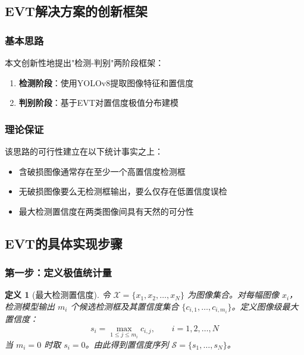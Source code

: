 \documentclass[12pt,a4paper]{ctexart}
\theoremstyle{cumcm}
\newtheorem{definition}{定义}[section]
\begin{document}
\subsection{EVT解决方案的创新框架}

\subsubsection{基本思路}

本文创新性地提出"检测-判别"两阶段框架：
\begin{enumerate}[leftmargin=2.2em,itemsep=2pt]
\item \textbf{检测阶段}：使用YOLOv8提取图像特征和置信度
\item \textbf{判别阶段}：基于EVT对置信度极值分布建模
\end{enumerate}

\subsubsection{理论保证}

该思路的可行性建立在以下统计事实之上：
\begin{itemize}
\item 含破损图像通常存在至少一个高置信度检测框
\item 无破损图像要么无检测框输出，要么仅存在低置信度误检
\item 最大检测置信度在两类图像间具有天然的可分性
\end{itemize}

\subsection{EVT的具体实现步骤}

\subsubsection{第一步：定义极值统计量}

\begin{definition}[最大检测置信度]
令 $\mathcal{X} = \{x_1, x_2, \ldots, x_N\}$ 为图像集合。对每幅图像 $x_i$，检测模型输出 $m_i$ 个候选检测框及其置信度集合 $\{c_{i,1}, \ldots, c_{i,m_i}\}$。定义图像级最大置信度：
\begin{equation}
s_i = \max_{1 \le j \le m_i} c_{i,j}, \qquad i = 1, 2, \ldots, N
\end{equation}
当 $m_i = 0$ 时取 $s_i = 0$。由此得到置信度序列 $\mathcal{S} = \{s_1, \ldots, s_N\}$。
\end{definition}
\end{document}
